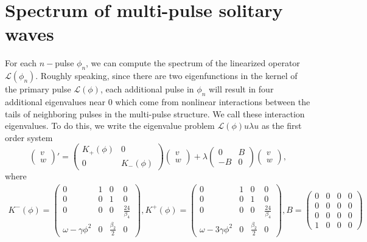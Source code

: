 \documentclass[12pt]{article}
\def\calL{{\mathcal L}}
\begin{document}
\section{Spectrum of multi-pulse solitary waves}

For each $n-$pulse $\phi_n$, we can compute the spectrum of the linearized operator $\calL(\phi_n)$. Roughly speaking, since there are two eigenfunctions in the kernel of the primary pulse $\calL(\phi)$, each additional pulse in $\phi_n$ will result in four additional eigenvalues near 0 which come from nonlinear interactions between the tails of neighboring pulses in the multi-pulse structure. We call these interaction eigenvalues. To do this, we write the eigenvalue problem $\calL(\phi)u \lambda u$ as the first order system
\begin{equation}
\begin{pmatrix}v \\ w\end{pmatrix}' =
\begin{pmatrix}K_+(\phi) & 0 \\ 0 & K_-(\phi) \end{pmatrix}
\begin{pmatrix}v \\ w\end{pmatrix}
+ \lambda \begin{pmatrix}0 & B \\ -B & 0\end{pmatrix}
\begin{pmatrix}v \\ w\end{pmatrix},
\end{equation}
where
\begin{align*}
K^-(\phi) = \begin{pmatrix}
0 & 1 & 0 & 0 \\
0 & 0 & 1 & 0 \\
0 & 0 & 0 & \frac{24}{\beta_4} \\
\omega - \gamma \phi^2 & 0 & \frac{\beta_2}{2} & 0
\end{pmatrix},
K^+(\phi) = \begin{pmatrix}
0 & 1 & 0 & 0 \\
0 & 0 & 1 & 0 \\
0 & 0 & 0 & \frac{24}{\beta_4} \\
\omega - 3 \gamma \phi^2 & 0 & \frac{\beta_2}{2} & 0
\end{pmatrix},
B = \begin{pmatrix}
0 & 0 & 0 & 0 \\
0 & 0 & 0 & 0 \\
0 & 0 & 0 & 0 \\
1 & 0 & 0 & 0
\end{pmatrix}
\end{align*}
\end{document}
